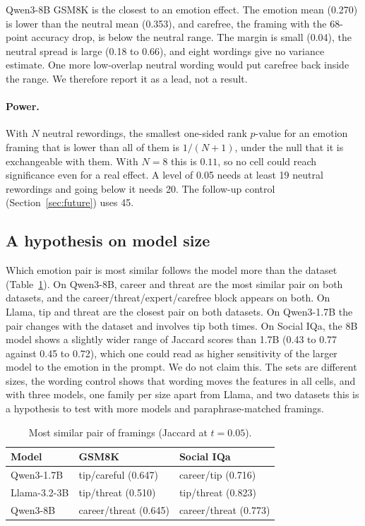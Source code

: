 \documentclass[11pt]{article}
\begin{document}
Qwen3-8B GSM8K is the closest to an emotion effect. The emotion mean (0.270) is lower than the neutral mean (0.353), and carefree, the framing with the 68-point accuracy drop, is below the neutral range. The margin is small (0.04), the neutral spread is large (0.18 to 0.66), and eight wordings give no variance estimate. One more low-overlap neutral wording would put carefree back inside the range. We therefore report it as a lead, not a result.

\paragraph{Power.} With $N$ neutral rewordings, the smallest one-sided rank $p$-value for an emotion framing that is lower than all of them is $1/(N{+}1)$, under the null that it is exchangeable with them. With $N{=}8$ this is $0.11$, so no cell could reach significance even for a real effect. A level of 0.05 needs at least 19 neutral rewordings and going below it needs 20. The follow-up control (Section~\ref{sec:future}) uses 45.

\subsection{A hypothesis on model size}
\label{sec:size}

Which emotion pair is most similar follows the model more than the dataset (Table~\ref{tab:pairs}). On Qwen3-8B, career and threat are the most similar pair on both datasets, and the career/threat/expert/carefree block appears on both. On Llama, tip and threat are the closest pair on both datasets. On Qwen3-1.7B the pair changes with the dataset and involves tip both times. On Social IQa, the 8B model shows a slightly wider range of Jaccard scores than 1.7B (0.43 to 0.77 against 0.45 to 0.72), which one could read as higher sensitivity of the larger model to the emotion in the prompt. We do not claim this. The sets are different sizes, the wording control shows that wording moves the features in all cells, and with three models, one family per size apart from Llama, and two datasets this is a hypothesis to test with more models and paraphrase-matched framings.

\begin{table}[t]
\centering\small
\begin{tabular}{lll}
\toprule
Model & GSM8K & Social IQa \\
\midrule
Qwen3-1.7B & tip/careful (0.647) & career/tip (0.716) \\
Llama-3.2-3B & tip/threat (0.510) & tip/threat (0.823) \\
Qwen3-8B & career/threat (0.645) & career/threat (0.773) \\
\bottomrule
\end{tabular}
\caption{Most similar pair of framings (Jaccard at $t{=}0.05$).}
\label{tab:pairs}
\end{table}
\end{document}

